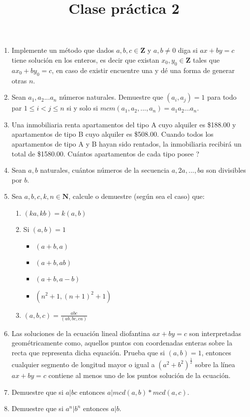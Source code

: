 \documentclass{article}
\begin{document}
\title{Clase pr\'actica 2}
\maketitle

\begin{enumerate}
    \item Implemente un m\'etodo que dados $a,b,c \in \mathbf{Z}$ y $a,b \neq 0$ diga si $ax + by =c$ tiene soluci\'on en los enteros, es decir que existan $x_0, y_0 \in \mathbf{Z}$ tales que $ax_0 + by_0 = c$, en caso de existir encuentre una y dé una forma de generar otras $n$.
    \item Sean $a_1, a_2 ... a_n$ n\'umeros naturales. Demuestre que $(a_i, a_j) = 1$ para todo par $1 \leq i < j \leq n$ si y solo si $mcm(a_1, a_2,...,a_n) = a_1a_2...a_n$.
    \item Una inmobiliaria renta apartamentos del tipo A cuyo alquiler es \$188.00 y apartamentos de tipo B cuyo alquiler es \$508.00. Cuando todos los apartamentos de tipo A y B hayan sido rentados, la inmobiliaria recibir\'a un total de \$1580.00. Cu\'antos apartamentos de cada tipo posee ?
    \item Sean $a,b$ naturales, cu\'antos n\'umeros de la secuencia $a, 2a, ..., ba$ son divisibles por $b$.
    \item Sea $a,b,c,k,n \in \mathbf{N}$, calcule o demuestre (seg\'un sea el caso) que:
    \begin{enumerate}
        \item $(ka, kb) = k (a,b)$
        \item Si $(a,b) = 1$
        \begin{itemize}
            \item $(a+b, a)$
            \item $(a+b, ab)$
            \item $(a+b, a-b)$
            \item $(n^2 +1, (n+1)^2 +1)$
        \end{itemize}
        \item $(a,b,c) = \frac{abc}{(ab,bc,ca)}$
    \end{enumerate}
    \item Las soluciones de la ecuación lineal diofantina $ax + by = c$ son interpretadas geométricamente como, aquellos puntos con coordenadas enteras sobre la recta que representa dicha equación. Prueba que si $(a, b) = 1$, entonces cualquier segmento de longitud mayor o igual a $(a^2 + b^2) ^ {\frac{1}{2}}$ sobre la línea $ax + by = c$ contiene al menos uno de los puntos solución de la ecuación.
    \item Demuestre que si $a | bc$ entonces $a | mcd(a,b) * mcd(a,c)$.
    \item Demuestre que si $a^n | b^n$ entonces $a | b$.
\end{enumerate}
\end{document}
